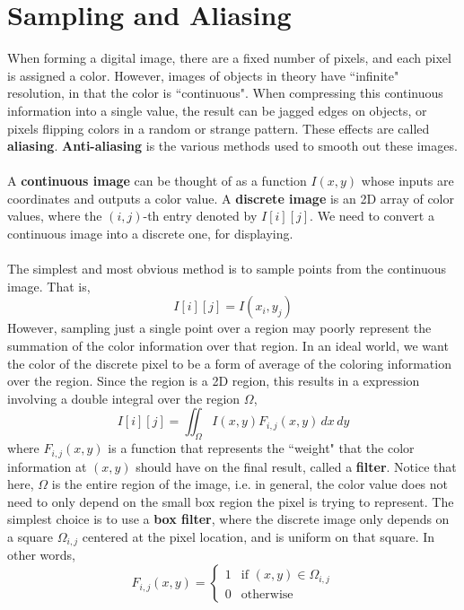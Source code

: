 \documentclass[letterpaper,12pt]{article}
\begin{document}
\section*{Sampling and Aliasing}
When forming a digital image, there are a fixed number of pixels, and each pixel is assigned a color. However, images of objects in theory have ``infinite" resolution, in that the color is ``continuous". When compressing this continuous information into a single value, the result can be jagged edges on objects, or pixels flipping colors in a random or strange pattern. These effects are called \textbf{aliasing}. \textbf{Anti-aliasing} is the various methods used to smooth out these images.
\\ \\ A \textbf{continuous image} can be thought of as a function $I(x,y)$ whose inputs are coordinates and outputs a color value. A \textbf{discrete image} is an 2D array of color values, where the $(i,j)$-th entry denoted by $I[i][j]$. We need to convert a continuous image into a discrete one, for displaying.
\\ \\ The simplest and most obvious method is to sample points from the continuous image. That is,
\begin{equation*}
    I[i][j] = I(x_i,y_j)
\end{equation*}
However, sampling just a single point over a region may poorly represent the summation of the color information over that region. In an ideal world, we want the color of the discrete pixel to be a form of average of the coloring information over the region. Since the region is a 2D region, this results in a expression involving a double integral over the region $\Omega$,
\begin{equation*}
    I[i][j] = \iint_{\Omega} I(x,y) F_{i,j}(x,y) \,dx \,dy
\end{equation*}
where $F_{i,j}(x,y)$ is a function that represents the ``weight" that the color information at $(x,y)$ should have on the final result, called a \textbf{filter}. Notice that here, $\Omega$ is the entire region of the image, i.e. in general, the color value does not need to only depend on the small box region the pixel is trying to represent. The simplest choice is to use a \textbf{box filter}, where the discrete image only depends on a square $\Omega_{i,j}$ centered at the pixel location, and is uniform on that square. In other words,
\begin{equation*}
    F_{i,j}(x,y) = \begin{cases} 1 & \text{if $(x,y) \in \Omega_{i,j}$} \\ 0 & \text{otherwise} \end{cases}
\end{equation*}
\end{document}
